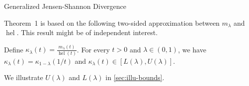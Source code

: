 \documentclass[final]{beamer}
\DeclareMathOperator{\hel}{hel}
\newcommand{\js}[2]{D_{\mathrm{JS}}( #1 \parallel #2 )}
\newcommand{\wjs}[3]{D_{\mathrm{GJS}}^{#1}( #2 \parallel #3 )}
\newlength{\threecolwid}
\begin{document}
\begin{frame}[t]
\begin{columns}[t]
\begin{column}{\threecolwid}
\begin{block}{Generalized Jensen-Shannon 
			Divergence}
		
		
		
		Theorem~1 is based on the following two-sided approximation 
		 between $ m_\lambda $ and $ \hel $. 
		This result might be of 
		independent interest.
		
			Define $ \kappa_\lambda(t) = \frac{m_\lambda(t)}{\hel(t)} $. For 
			every 
			$ 
			t>0 $ 
			and $ \lambda\in (0,1) $, we have
			$
			\kappa_\lambda(t) = \kappa_{1-\lambda}(1/t)
			$ and $
			\kappa_\lambda(t) \in [L(\lambda), U(\lambda) ]
			$.
		
		We illustrate  $ U(\lambda) $ and $ 
		L(\lambda) $ in \cref{sec:illu-bounds}. 
		
		

\end{block}
\end{column}
\end{columns}
\end{frame}
\end{document}
